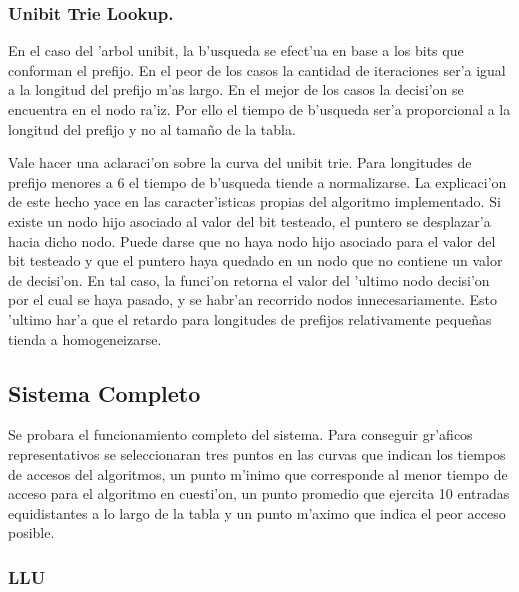 \documentclass[12pt,spanish]{article}
\begin{document}
\subsubsection{Unibit Trie Lookup.}

En el caso del 'arbol unibit, la b'usqueda se efect'ua en base a los bits que conforman el prefijo. En el peor de los casos la cantidad de iteraciones ser'a igual a la longitud del prefijo m'as largo. En el mejor de los casos la decisi'on se encuentra en el nodo ra'iz. Por ello el tiempo de b'usqueda ser'a proporcional a la longitud del prefijo y no al tama\~no de la tabla.

Vale hacer una aclaraci'on sobre la curva del unibit trie. Para longitudes de prefijo menores a 6 el tiempo de b'usqueda tiende a normalizarse. La explicaci'on de este hecho yace en las caracter'isticas propias del algoritmo implementado. Si existe un nodo hijo asociado al valor del bit testeado, el puntero se desplazar'a hacia dicho nodo. Puede darse que no haya nodo hijo asociado para el valor del bit testeado y que el puntero haya quedado en un nodo que no contiene un valor de decisi'on. En tal caso, la funci'on retorna el valor del 'ultimo nodo decisi'on por el cual se haya pasado, y se habr'an recorrido nodos innecesariamente. Esto 'ultimo har'a que el retardo para longitudes de prefijos relativamente peque\~nas tienda a homogeneizarse.

\subsection{Sistema Completo}

Se probara el funcionamiento completo del sistema. Para conseguir gr'aficos representativos se seleccionaran tres puntos en las curvas que indican los tiempos de accesos del algoritmos, un punto m'inimo que corresponde al menor tiempo de acceso para el algoritmo en cuesti'on, un punto promedio que ejercita 10 entradas equidistantes a lo largo de la tabla y un punto m'aximo que indica el peor acceso posible. 

\subsubsection{LLU}
\end{document}
